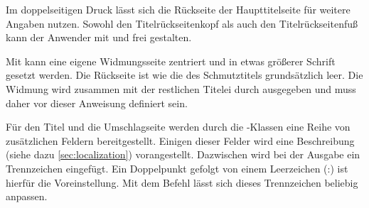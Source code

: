 \begin{Declaration}{}
\begin{Declaration}{}
\begin{Declaration}{}
\begin{Declaration}{}
\begin{Declaration}{}
\begin{Declaration}{}
\begin{Declaration}{}
\begin{Declaration}{}
\begin{Declaration}{}
%
Im doppelseitigen Druck lässt sich die Rückseite der Haupttitelseite für 
weitere Angaben nutzen. Sowohl den Titelrückseitenkopf als auch den
Titelrückseitenfuß kann der Anwender mit  und 
 frei gestalten.

Mit  kann eine eigene Widmungsseite zentriert und in etwas 
größerer Schrift gesetzt werden. Die Rückseite ist wie die des Schmutztitels 
grundsätzlich leer. Die Widmung wird zusammen mit der restlichen Titelei durch 
 ausgegeben und muss daher vor dieser Anweisung definiert sein.
\end{Declaration}
\end{Declaration}
\end{Declaration}
\end{Declaration}
\end{Declaration}
\end{Declaration}
\end{Declaration}
\end{Declaration}
\end{Declaration}

\begin{Declaration}{}
\printdeclarationlist%
%
Für den Titel und die Umschlagseite werden durch die \TUDScript-Klassen
eine Reihe von zusätzlichen Feldern bereitgestellt. Einigen dieser Felder wird 
eine Beschreibung (siehe dazu \autoref{sec:localization}) vorangestellt. 
Dazwischen wird bei der Ausgabe ein Trennzeichen eingefügt. Ein Doppelpunkt 
gefolgt von einem Leerzeichen (:) ist hierfür die 
Voreinstellung. Mit dem Befehl  lässt sich dieses 
Trennzeichen beliebig anpassen.
\end{Declaration}


